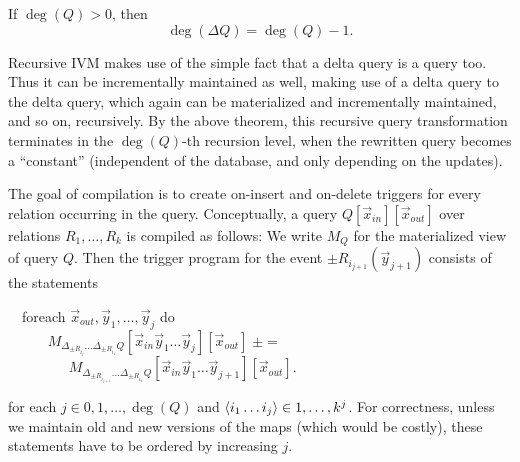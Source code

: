 \begin{theorem}
If $\deg(Q) > 0$, then \[\deg(\Delta Q) = \deg(Q) - 1.\]
\end{theorem}

Recursive IVM makes use of the simple fact that a delta query is a query too. Thus it can be incrementally maintained as well, making use of a delta query to the delta query, which again can be materialized and incrementally maintained, and so on, recursively.
By the above theorem, this recursive query transformation terminates in the $\deg(Q)$-th recursion level,
when the rewritten query becomes a ``constant'' (independent of the database, and only depending on the updates).

The goal of compilation is to create on-insert and on-delete triggers for every relation occurring in the query.
Conceptually, a query $Q[\vec{x}_{in}][\vec{x}_{out}]$ over relations $R_1, \dots, R_k$ is compiled as follows:
We write $M_Q$ for the materialized view of query $Q$. 
Then the trigger program for the event $\pm R_{i_{j+1}}(\vec{y}_{j+1})$ consists of the
statements

\begin{tabbing}
~~foreach $\vec{x}_{out}, \vec{y}_1, \dots, \vec{y}_j$ do \\
~~~~~
   $M_{\Delta_{\pm R_{i_j}} \dots \Delta_{\pm R_{i_1}} Q}
       [\vec{x}_{in}\vec{y}_1 \dots \vec{y}_j][\vec{x}_{out}] \;\pm=$ \\
~~~~~~~~
    $M_{\Delta_{\pm R_{i_{j+1}}} \dots \Delta_{\pm R_{i_1}} Q}
       [\vec{x}_{in}\vec{y}_1 \dots \vec{y}_{j+1}][\vec{x}_{out}]$.
\end{tabbing}
for each $j \in 0, 1, \dots, \deg(Q)$ and ${\langle i_1 \dots i_j\rangle} \in 1, \dots, k^j$.
For correctness, unless we maintain
old and new versions of the maps (which would be costly), these statements have to be 
ordered by increasing $j$.

